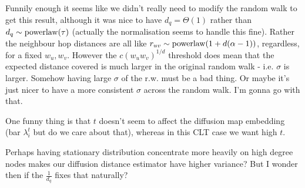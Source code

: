Funnily enough it seems like we didn't really need to modify the random walk to get this result, although it was nice to have $d_q = \Theta(1)$ rather than $d_q \sim \operatorname{powerlaw}(\tau)$ (actually the normalisation seems to handle this fine). Rather the neighbour hop distances are all like $r_{uv} \sim \operatorname{powerlaw}(1 + d(\alpha-1))$, regardless, for a fixed $w_u, w_v$. However the $c (w_u w_v)^{1/d}$ threshold does mean that the expected distance covered is much larger in the original random walk - i.e. $\sigma$ is larger. Somehow having large $\sigma$ of the r.w. must be a bad thing. Or maybe it's just nicer to have a more consistent $\sigma$ across the random walk. I'm gonna go with that.


One funny thing is that $t$ doesn't seem to affect the diffusion map embedding (bar $\lambda_i^t$ but do we care about that), whereas in this CLT case we want high $t$.

Perhaps having stationary distribution concentrate more heavily on high degree nodes makes our diffusion distance estimator have higher variance? But I wonder then if the $\frac{1}{d_q}$ fixes that naturally? 








